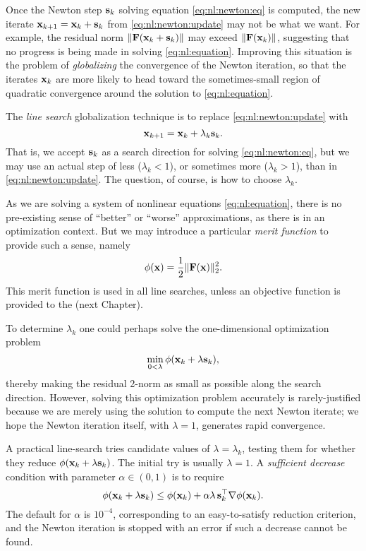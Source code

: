Once the Newton step $\mathbf{s}_k$ solving equation \eqref{eq:nl:newton:eq} is computed, the new iterate $\mathbf{x}_{k+1} = \mathbf{x}_k + \mathbf{s}_k$ from \eqref{eq:nl:newton:update} may not be what we want.  For example, the residual norm $\|\mathbf{F}(\mathbf{x}_k + \mathbf{s}_k)\|$ may exceed $\|\mathbf{F}(\mathbf{x}_{k})\|$, suggesting that no progress is being made in solving \eqref{eq:nl:equation}.  Improving this situation is the problem of \emph{globalizing} the convergence of the Newton iteration, so that the iterates $\mathbf{x}_k$ are more likely to head toward the sometimes-small region of quadratic convergence around the solution to \eqref{eq:nl:equation}.

The \emph{line search} globalization technique \citep{DennisSchnabel1983} is to replace \eqref{eq:nl:newton:update} with
\begin{equation}
\mathbf{x}_{k+1} = \mathbf{x}_k + \lambda_k \mathbf{s}_k.  \label{eq:nl:linesearchupdate}
\end{equation}
That is, we accept $\mathbf{s}_k$ as a search direction for solving \eqref{eq:nl:newton:eq}, but we may use an actual step of less ($\lambda_k < 1$), or sometimes more ($\lambda_k > 1$), than in \eqref{eq:nl:newton:update}.  The question, of course, is how to choose $\lambda_k$.

As we are solving a system of nonlinear equations \eqref{eq:nl:equation}, there is no pre-existing sense of ``better'' or ``worse'' approximations, as there is in an optimization context.  But we may introduce a particular \emph{merit function} \citep{NocedalWright2006} to provide such a sense, namely
\begin{equation}
\phi(\mathbf{x}) = \frac{1}{2} \|\mathbf{F}(\mathbf{x})\|_2^2.  \label{eq:nl:linesearchmeritfunction}
\end{equation}
This merit function is used in all \pSNES line searches, unless an objective function is provided to the \pSNES (next Chapter).

To determine $\lambda_k$ one could perhaps solve the one-dimensional optimization problem
\begin{equation}
\min_{0<\lambda} \phi(\mathbf{x}_k + \lambda \mathbf{s}_k),  \label{eq:nl:linesearchperhapsopt}
\end{equation}
thereby making the residual 2-norm as small as possible along the search direction.  However, solving this optimization problem accurately is rarely-justified because we are merely using the solution to compute the next Newton iterate; we hope the Newton iteration itself, with $\lambda=1$, generates rapid convergence.

A practical line-search tries candidate values of $\lambda=\lambda_k$, testing them for whether they reduce $\phi(\mathbf{x}_k + \lambda \mathbf{s}_k)$.  The initial try is usually $\lambda=1$.  A \emph{sufficient  decrease} condition with parameter $\alpha\in(0,1)$ is to require
\begin{equation}
\phi(\mathbf{x}_k + \lambda \mathbf{s}_k) \le \phi(\mathbf{x}_k) + \alpha \lambda\, \mathbf{s}_k^\top \nabla \phi(\mathbf{x}_k).  \label{eq:nl:linesearchsuffdecrease}
\end{equation}
The \PETSc default for $\alpha$ is $10^{-4}$, corresponding to an easy-to-satisfy reduction criterion, and the Newton iteration is stopped with an error if such a decrease cannot be found.

